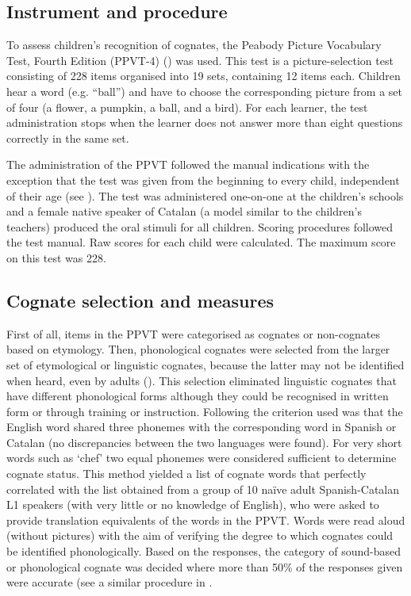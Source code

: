 \documentclass[output=paper,modfonts,nonflat,newtxmath]{langsci/langscibook}
\begin{document}
\subsection{Instrument and procedure}

{To assess children’s recognition of cognates, the Peabody Picture Vocabulary Test, Fourth Edition (PPVT-4) (\citealt{DunnDunn2007}) was used. This test is a picture-selection test consisting of 228 items organised into 19 sets, containing 12 items each. Children hear a word (e.g. “ball”}{)} {and have to choose the corresponding picture from a set of four (a flower, a pumpkin, a ball, and a bird). For each learner, the test administration stops when the learner does not answer more than eight questions correctly in the same set.}

{The administration of the PPVT followed the manual indications with the exception that the test was given from the beginning to every child, independent of their age (see \citealt{UnsworthEtAl2015}). The test was administered one-on-one at the children’s schools and a female native speaker of Catalan (a model similar to the children’s teachers) produced the oral stimuli for all children. Scoring procedures followed the test manual. Raw scores for each child were calculated. The maximum score on this test was 228.}

\subsection{Cognate selection and measures} %

{First of all, items in the PPVT were categorised as cognates or non-cognates based on etymology. Then, phonological cognates were selected from the larger set of etymological or linguistic cognates, because the latter may not be identified when heard, even by adults (\citealt{Stadthagen-GonzálezEtAl2013}). This selection eliminated linguistic cognates that have different phonological forms although they could be recognised in written form or through training or instruction. Following \citet{MendezPerezEtAl2010} the criterion used was that the English word shared three phonemes with the corresponding word in Spanish or Catalan (no discrepancies between the two languages were found). For very short words such as ‘chef’ two equal phonemes were considered sufficient to determine cognate status. This method yielded a list of cognate words that perfectly correlated with the list obtained from a group of 10 naïve adult Spanish-Catalan L1 speakers (with very little or no knowledge of English), who were asked to provide translation equivalents of the words in the PPVT. Words were read aloud (without pictures) with the aim of verifying the degree to which cognates could be identified phonologically. Based on the responses, the category of sound-based or phonological cognate was decided where more than 50\% of the responses given were accurate (see a similar procedure in \citealt{Stadthagen-GonzálezEtAl2013}.}
\end{document}
